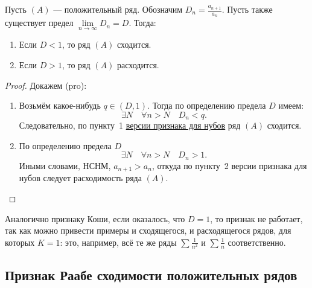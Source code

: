 \begin{theorem}[pro]
	Пусть \((A)\) --- положительный ряд. Обозначим \linebreak \(D_n = \frac{a_{n+1}}{a_n}\). Пусть также существует предел \(\lim\limits_{n \to \infty} D_n = D\). Тогда:
	\begin{enumerate}
		\item Если \(D < 1\), то ряд \((A)\) сходится.
		\item Если \(D > 1\), то ряд \((A)\) расходится.
	\end{enumerate}
\end{theorem}
\begin{proof}
	Докажем (pro):
	\begin{enumerate}
		\item Возьмём какое-нибудь \(q \in (D, 1)\). Тогда по определению предела \(D\) имеем: \[
			\exists N \quad \forall n > N \quad D_n < q.
		\]
		Следовательно, по пункту~1 \hyperlink{Даламбер-нуб}{версии признака для нубов} ряд \((A)\) сходится.
		\item По определению предела  \(D\) \[
			\exists N \quad \forall n > N \quad D_n > 1.
		\]
		Иными словами, НСНМ,  \(a_{n+1} > a_n\), откуда по пункту~2 версии признака для нубов следует расходимость ряда \((A)\).
	\end{enumerate}
\end{proof}

\begin{remark}
	Аналогично признаку Коши, если оказалось, что \(D = 1\), то признак не работает, так как можно привести примеры и сходящегося, и расходящегося рядов, для которых \(K = 1\): это, например, всё те же ряды \(\sum \frac{1}{n^2}\) и \(\sum \frac{1}{n}\) соответственно.
\end{remark}

\subsection{Признак Раабе сходимости положительных рядов}


